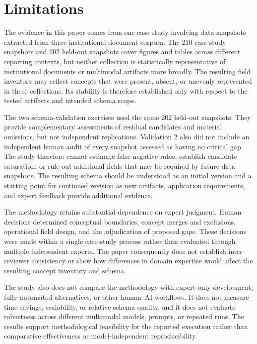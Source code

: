 \documentclass{article}
\begin{document}
\section{Limitations}

The evidence in this paper comes from one case study involving data snapshots extracted from three institutional document corpora. The 210 case study snapshots and 202 held-out snapshots cover figures and tables across different reporting contexts, but neither collection is statistically representative of institutional documents or multimodal artifacts more broadly. The resulting field inventory may reflect concepts that were present, absent, or unevenly represented in these collections. Its stability is therefore established only with respect to the tested artifacts and intended schema scope.

The two schema-validation exercises used the same 202 held-out snapshots. They provide complementary assessments of residual candidates and material omissions, but not independent replications. Validation 2 also did not include an independent human audit of every snapshot assessed as having no critical gap. The study therefore cannot estimate false-negative rates, establish candidate saturation, or rule out additional fields that may be required by future data snapshots. The resulting schema should be understood as an initial version and a starting point for continued revision as new artifacts, application requirements, and expert feedback provide additional evidence.

The methodology retains substantial dependence on expert judgment. Human decisions determined conceptual boundaries, concept merges and exclusions, operational field design, and the adjudication of proposed gaps. These decisions were made within a single case-study process rather than evaluated through multiple independent experts. The paper consequently does not establish inter-reviewer consistency or show how differences in domain expertise would affect the resulting concept inventory and schema.

The study also does not compare the methodology with expert-only development, fully automated alternatives, or other human--AI workflows. It does not measure time savings, scalability, or relative schema quality, and it does not evaluate robustness across different multimodal models, prompts, or repeated runs. The results support methodological feasibility for the reported execution rather than comparative effectiveness or model-independent reproducibility.
\end{document}
